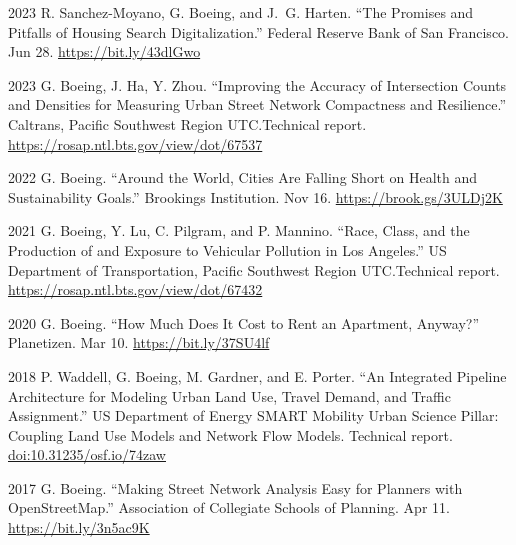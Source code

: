 \documentclass[11pt,letterpaper]{report}
\begin{document}
    \begin{tablist}

        \item[2023] \tab{}R. Sanchez-Moyano, G. Boeing, and J.~G. Harten. \enquote{The Promises and Pitfalls of Housing Search Digitalization.} Federal Reserve Bank of San Francisco. Jun 28. \href{https://bit.ly/43dlGwo}{https://bit.ly/43dlGwo}

        \item[2023] \tab{}G. Boeing, J. Ha, Y. Zhou. \enquote{Improving the Accuracy of Intersection Counts and Densities for Measuring Urban Street Network Compactness and Resilience.} Caltrans, Pacific Southwest Region UTC.\@ Technical report. \href{https://rosap.ntl.bts.gov/view/dot/67537}{https://rosap.ntl.bts.gov/view/dot/67537}

        \item[2022] \tab{}G. Boeing. \enquote{Around the World, Cities Are Falling Short on Health and Sustainability Goals.} Brookings Institution. Nov 16. \href{https://brook.gs/3ULDj2K}{https://brook.gs/3ULDj2K}

        \item[2021] \tab{}G. Boeing, Y. Lu, C. Pilgram, and P. Mannino. \enquote{Race, Class, and the Production of and Exposure to Vehicular Pollution in Los Angeles.} US Department of Transportation, Pacific Southwest Region UTC.\@ Technical report. \href{https://rosap.ntl.bts.gov/view/dot/67432}{https://rosap.ntl.bts.gov/view/dot/67432}

        \item[2020] \tab{}G. Boeing. \enquote{How Much Does It Cost to Rent an Apartment, Anyway?} Planetizen. Mar 10. \href{https://bit.ly/37SU4lf}{https://bit.ly/37SU4lf}

        \item[2018] \tab{}P. Waddell, G. Boeing, M. Gardner, and E. Porter. \enquote{An Integrated Pipeline Architecture for Modeling Urban Land Use, Travel Demand, and Traffic Assignment.} US Department of Energy SMART Mobility Urban Science Pillar: Coupling Land Use Models and Network Flow Models. Technical report. \href{https://doi.org/10.31235/osf.io/74zaw}{doi:10.31235/osf.io/74zaw}

        \item[2017] \tab{}G. Boeing. \enquote{Making Street Network Analysis Easy for Planners with OpenStreetMap.} Association of Collegiate Schools of Planning. Apr 11. \href{https://bit.ly/3n5ac9K}{https://bit.ly/3n5ac9K}

    \end{tablist}
\end{document}
